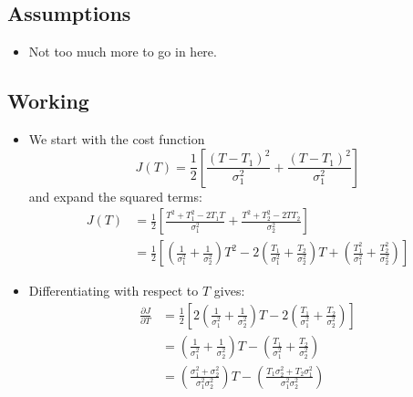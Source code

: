 \subsection{Assumptions}
\label{sub:cost:assumptions}

\begin{itemize}
    \item Not too much more to go in here.
\end{itemize}

\subsection{Working}
\label{sub:cost:working}

\begin{itemize}
    \item We start with the cost function
    \begin{equation}
        J(T) = \frac{1}{2} \left[ \frac{\left( T - T_1 \right)^2}{\sigma_1^2} + \frac{\left( T - T_1 \right)^2}{\sigma_1^2} \right]
    \end{equation}
    and expand the squared terms:
    \begin{align*}
        J(T) &= \frac{1}{2} \left[ \frac{T^2 + T_1^2 - 2 T_1 T}{\sigma_1^2} + \frac{T^2 + T_2^2 - 2 T T_2}{\sigma_2^2} \right] \\
                &= \frac{1}{2} \left[ 
                    \left( \frac{1}{\sigma_1^2} + \frac{1}{\sigma_2^2} \right) T^2 
                    - 2 \left( \frac{T_1}{\sigma_1^2} + \frac{T_2}{\sigma_2^2} \right) T
                    + \left( \frac{T_1^2}{\sigma_1^2} + \frac{T_2^2}{\sigma_2^2} \right) 
                    \right]
    \end{align*}
    \item Differentiating with respect to $T$ gives:
    \begin{align}
        \frac{\partial J}{\partial T} &= \frac{1}{2} 
        \left[
            2 \left( \frac{1}{\sigma_1^2} + \frac{1}{\sigma_2^2} \right) T
            - 2 \left( \frac{T_1}{\sigma_1^2} + \frac{T_2}{\sigma_2^2} \right)
        \right] \nonumber \\
        &= \left( \frac{1}{\sigma_1^2} + \frac{1}{\sigma_2^2} \right) T
            - \left( \frac{T_1}{\sigma_1^2} + \frac{T_2}{\sigma_2^2} \right) \nonumber \\
        &= \left(\frac{\sigma_1^2 + \sigma_2^2}{\sigma_1^2 \sigma_2^2} \right) T
            - \left( \frac{T_1 \sigma_2^2 + T_2 \sigma_1^2}{\sigma_1^2 \sigma_2^2} \right) \nonumber \\

\end{align}
\end{itemize}
